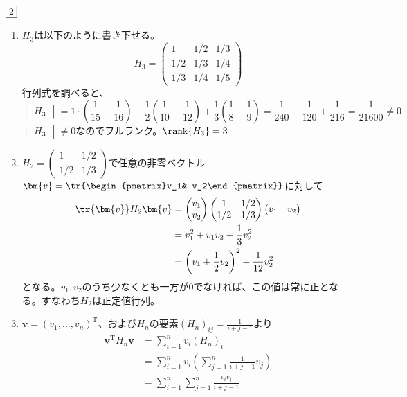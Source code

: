 \documentclass[dvipdfmx]{jsreport}
\begin{document}
\begin{souanswer} %
	$\fbox{2}$
\begin{enumerate}
	\item $H_3$は以下のように書き下せる。
\begin{equation*}
	H_3= 
\begin{pmatrix}
	1& 1/2& 1/3\\
	1/2& 1/3& 1/4\\
	1/3& 1/4& 1/5
\end{pmatrix}
\end{equation*}
	行列式を調べると、
\begin{equation*}
	\begin{vmatrix}H_3\end{vmatrix}= 1\cdot \left(\frac{1}{15}- \frac{1}{16}\right)- \frac{1}{2}\left(\frac{1}{10}- \frac{1}{12}\right)+ \frac{1}{3}\left(\frac{1}{8}- \frac{1}{9}\right)= \frac{1}{240}- \frac{1}{120}+ \frac{1}{216}= \frac{1}{21600}\ne 0
\end{equation*}
	$\begin{vmatrix}H_3\end{vmatrix}\ne 0$なのでフルランク。$\rank{H_3}= 3$

	\item $H_2= \begin{pmatrix}1& 1/2\\ 1/2& 1/3\end{pmatrix}$で任意の非零ベクトル$\bm{v}= \tr{\begin{pmatrix}v_1& v_2\end{pmatrix}}$に対して
\begin{align*}
	\tr{\bm{v}}H_2\bm{v}
	&= \begin{pmatrix}v_1\\ v_2\end{pmatrix}\begin{pmatrix}1& 1/2\\ 1/2& 1/3\end{pmatrix}\begin{pmatrix}v_1& v_2\end{pmatrix}\\
	&= v_1^2+ v_1v_2+ \frac{1}{3}v_2^2\\
	&= \left(v_1+ \frac{1}{2}v_2\right)^2+ \frac{1}{12}v_2^2
\end{align*}
	となる。$v_1, v_2$のうち少なくとも一方が0でなければ、この値は常に正となる。すなわち$H_2$は正定値行列。

	\item $\bm{v}= (v_1, \ldots, v_n)^\mathrm{T}$、および$H_n$の要素$(H_n)_{ij}= \frac{1}{i+ j- 1}$より
\begin{align*}
	\bm{v}^\mathrm{T}H_n\bm{v}
	&= \sum_{i= 1}^n v_i (H_n)_i\\
	&= \sum_{i= 1}^n v_i\left(\sum_{j= 1}^n \frac{1}{i+ j- 1}v_j\right)\\
	&= \sum_{i= 1}^n \sum_{j= 1}^n\frac{v_i v_j}{i+ j- 1}
\end{align*}


\end{enumerate}
\end{souanswer}
\end{document}
